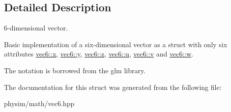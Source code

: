 \subsection{Detailed Description}
6-\/dimensional vector. 

Basic implementation of a six-\/dimensional vector as a struct with only six attributes \hyperlink{structphysim_1_1math_1_1vec6_a38324c181585016fc93ec6d64532d649}{vec6\+::x}, \hyperlink{structphysim_1_1math_1_1vec6_a1f17bfbd699b91f52527d61302bd97d8}{vec6\+::y}, \hyperlink{structphysim_1_1math_1_1vec6_a97d6e428b29374a491d63c0470e6c1e9}{vec6\+::z}, \hyperlink{structphysim_1_1math_1_1vec6_a20a084c3874c741f3c8f90b184b563bc}{vec6\+::u}, \hyperlink{structphysim_1_1math_1_1vec6_ade41c2d920828684bfcfa76563bb65d5}{vec6\+::v} and \hyperlink{structphysim_1_1math_1_1vec6_ac35ab7be6a7783abff02bf48968dec6a}{vec6\+::w}.

The notation is borrowed from the \textquotesingle{}glm\textquotesingle{} library. 

The documentation for this struct was generated from the following file\+:\begin{DoxyCompactItemize}
\item 
physim/math/vec6.\+hpp\end{DoxyCompactItemize}
